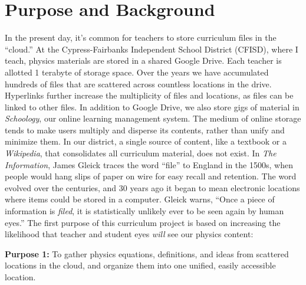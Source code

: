 \documentclass[12pt]{article}
\begin{document}
\section{Purpose and Background}
In the present day, it's common for teachers to store curriculum files in the ``cloud.''  At the Cypress-Fairbanks Independent School District (CFISD), where I teach, physics materials are stored in a shared Google Drive. Each teacher is allotted 1 terabyte of storage space. Over the years we have accumulated hundreds of files that are scattered across countless locations in the drive. Hyperlinks further increase the multiplicity of files and locations, as files can be linked to other files. In addition to Google Drive, we also store gigs of material in \textit{Schoology}, our online learning management system. The medium of online storage tends to make users multiply and disperse its contents, rather than unify and minimize them. In our district, a single source of content, like a textbook or a \textit{Wikipedia}, that consolidates all curriculum material, does not exist. In \textit{The Information}, James Gleick traces the word ``file'' to England in the 1500s, when people would hang slips of paper on wire for easy recall and retention. The word evolved over the centuries, and 30 years ago it began to mean electronic locations where items could be stored in a computer. Gleick warns, ``Once a piece of information is \textit{filed}, it is statistically unlikely ever to be seen again by human eyes.''  The first purpose of this curriculum project is based on increasing the likelihood that teacher and student eyes \textit{will} see our physics content:

\begin{mdframed}[backgroundcolor=black!20]
    \textbf{Purpose 1:} To gather physics equations, definitions, and ideas from scattered locations in the cloud, and organize them into one unified, easily accessible location.
\end{mdframed}



\clearpage
\end{document}

